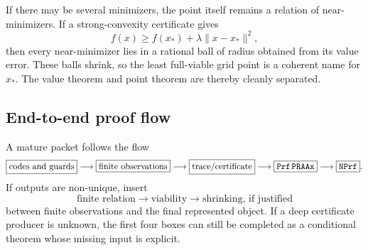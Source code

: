 If there may be several minimizers, the point itself remains a relation of
near-minimizers.  If a strong-convexity certificate gives
\[
 f(x)\ge f(x_*)+\lambda\|x-x_*\|^2,
\]
then every near-minimizer lies in a rational ball of radius obtained from its
value error.  These balls shrink, so the least full-viable grid point is a
coherent name for \(x_*\).  The value theorem and point theorem are thereby
cleanly separated.

\subsection{End-to-end proof flow}

A mature packet follows the flow
\[
\boxed{\text{codes and guards}}
\longrightarrow
\boxed{\text{finite observations}}
\longrightarrow
\boxed{\text{trace/certificate}}
\longrightarrow
\boxed{\texttt{Prf}\,\texttt{PRAAx}}
\longrightarrow
\boxed{\texttt{NPrf}}.
\]
If outputs are non-unique, insert
\[
\boxed{\text{finite relation}}
\longrightarrow
\boxed{\text{viability}}
\longrightarrow
\boxed{\text{shrinking, if justified}}
\]
between finite observations and the final represented object.  If a deep
certificate producer is unknown, the first four boxes can still be completed
as a conditional theorem whose missing input is explicit.

